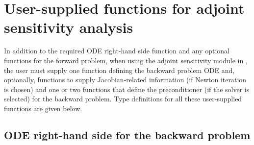 \section{User-supplied functions for adjoint sensitivity analysis}\label{ss:user_fct_adj}
In addition to the required ODE right-hand side function and any optional functions
for the forward problem, when using the adjoint sensitivity module in {\cvodes},
the user must supply one function defining the backward problem ODE and, optionally,
functions to supply Jacobian-related information (if Newton iteration is chosen) and
one or two functions that define the preconditioner (if the {\cvspgmr} solver is
selected) for the backward problem.
Type definitions for all these user-supplied functions are given below.

\subsection{ODE right-hand side for the backward problem}

